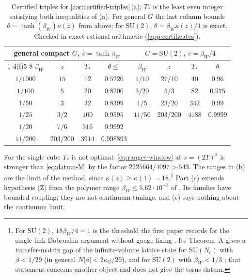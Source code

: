 \documentclass[11pt,a4paper]{amsart}
\theoremstyle{definition}
\theoremstyle{remark}
\numberwithin{equation}{section}
\newcommand{\abs}[1]{\lvert #1\rvert}      %
\newcommand{\SU}{\mathrm{SU}}              %
\newcommand{\cube}[1]{(2#1)^3}             %
\newcommand{\betaW}{\beta_{W}}             %
\begin{document}
\begin{table}[htbp]
\centering
\begin{tabular}{@{}cccc@{\qquad}cccc@{}}
\toprule
\multicolumn{4}{c}{general compact $G$, $c=\tanh\betaW$} & \multicolumn{4}{c}{$G=\SU(2)$, $c=\betaW/4$}\\
\cmidrule(r){1-4}\cmidrule(l){5-8}
$\betaW$ & $z$ & $T_*$ & $\theta\le$ & $\betaW$ & $z$ & $T_*$ & $\theta$\\
\midrule
$1/1000$ & $15$ & $12$ & $0.5220$ & $1/10$ & $27/10$ & $40$ & $0.96$\\
$1/100$ & $5$ & $20$ & $0.8200$ & $3/20$ & $5/3$ & $82$ & $0.975$\\
$1/50$ & $3$ & $32$ & $0.8399$ & $1/5$ & $23/20$ & $342$ & $0.99$\\
$1/25$ & $3/2$ & $100$ & $0.9595$ & $11/50$ & $203/200$ & $4188$ & $0.9999$\\
$1/20$ & $7/6$ & $316$ & $0.9992$ & & & & \\
$11/200$ & $203/200$ & $3914$ & $0.998893$ & & & & \\
\bottomrule
\end{tabular}
\caption{Certified triples for \cref{cor:certified-triples}\,(a); $T_*$ is the least even integer satisfying both inequalities of (a). For general $G$ the last column bounds $\theta=\tanh(\betaW)\kappa(z)$ from above; for $\SU(2)$, $\theta=\betaW\kappa(z)/4$ is exact. Checked in exact rational arithmetic (\cref{app:certificates}).}
\label{tab:certified-triples}
\end{table}

For the single cube $T_*$ is not optimal: \eqref{eq:ranges-window} at $s=\cube{T}$ is stronger than \eqref{eq:datum-M} by the factor $2225664/4097>543$. The ranges in (b) are the limit of the method, since $\kappa(z)\ge\kappa(1)=18$.\footnote{For $\SU(2)$, $18\betaW/4=1$ is the threshold the first paper records for the single-link Dobrushin argument without gauge fixing \cite[\S4]{bhattacharjee2026first}. Its Theorem~A gives a transfer-matrix gap of the infinite-volume lattice state for $\SU(N_c)$ with $\beta<1/29$ (in general $N\abs{\beta}<2\kappa_G/29$), and for $\SU(2)$ with $\betaW<1/3$ \cite[Thm.~A]{bhattacharjee2026first}; that statement concerns another object and does not give the torus datum.} Part (c) extends hypothesis (Z) from the polymer range $\betaW\le5.62\cdot10^{-3}$ of \cite[Prop.~11]{bhattacharjee2026first}. Its families have bounded coupling; they are not continuum tunings, and (c) says nothing about the continuum limit.
\end{document}
